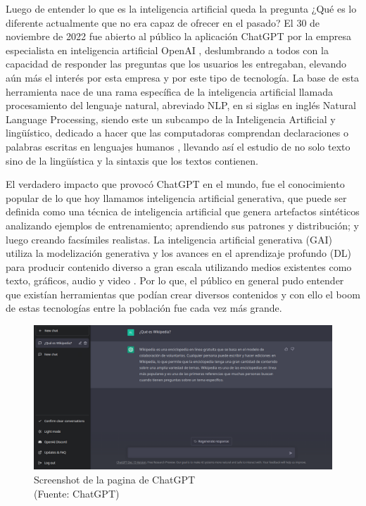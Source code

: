 \newpage

\par Luego de entender lo que es la inteligencia artificial queda la pregunta ¿Qué es lo diferente actualmente que no era capaz de ofrecer en el pasado? 
El 30 de noviembre de 2022 fue abierto al público la aplicación ChatGPT por la empresa especialista en inteligencia artificial OpenAI \cite{mt3}, deslumbrando a todos 
con la capacidad de responder las preguntas que los usuarios les entregaban, elevando aún más el interés por esta empresa y por este tipo de tecnología.
La base de esta herramienta nace de una rama específica de la inteligencia artificial llamada procesamiento del lenguaje 
natural, abreviado NLP, en si siglas en inglés Natural Language Processing, siendo este un subcampo de la Inteligencia Artificial y lingüístico, dedicado a hacer que las 
computadoras comprendan declaraciones o palabras escritas en lenguajes humanos \cite{nlpeda}, llevando así el estudio de no solo texto sino de la lingüística y la sintaxis que los textos contienen.


\par El verdadero impacto que provocó ChatGPT en el mundo, fue el conocimiento popular de lo que hoy llamamos inteligencia 
artificial generativa, que puede ser definida como una técnica de inteligencia artificial que genera artefactos sintéticos analizando 
ejemplos de entrenamiento; aprendiendo sus patrones y distribución; y luego creando facsímiles realistas. La inteligencia 
artificial generativa (GAI) utiliza la modelización generativa y los avances en el aprendizaje profundo (DL) para producir 
contenido diverso a gran escala utilizando medios existentes como texto, gráficos, audio y video \cite{mt2}. Por lo que, el público en
general pudo entender que existían herramientas que podían crear diversos contenidos y con ello el boom de estas 
tecnologías entre la población fue cada vez más grande. \\


\begin{figure}[ht!]
    \centering
    \includegraphics[width=.8\textwidth]{figures/ea2.png}
    \caption[Screenshot de la pagina de ChatGPT]{Screenshot de la pagina de ChatGPT \\
    {\scriptsize (Fuente: ChatGPT)}}

    \label{fig:ea2}
\end{figure}

